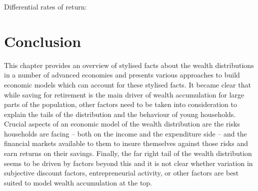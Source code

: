 Differential rates of return: \citet{BenhabibBisinZhu2011}
\citet{DeNardiYang2015}

\section{Conclusion}
This chapter provides an overview of stylised facts about the wealth 
distributions in a number of advanced economies and presents various approaches 
to build economic models which can account for these stylised facts.
It became clear that while saving for retirement is the main driver of wealth
accumulation for large parts of the population, other factors need to be taken
into consideration to explain the tails of the distribution and the behaviour of
young households. Crucial aspects of an economic model of the wealth 
distribution are the risks households are facing -- both on the income and the 
expenditure side -- and the financial markets available to them to insure 
themselves against those risks and earn returns on their savings. Finally, the 
far right tail of the wealth distribution seems to be driven by factors beyond 
this and it is not clear whether variation in subjective discount factors, 
entrepreneurial activity, or other factors are best suited to model wealth 
accumulation at the top.
 
